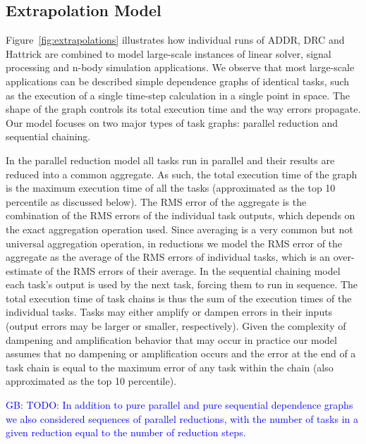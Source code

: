 \documentclass[10pt, conference, compsocconf]{IEEEtran}
\newcommand{\greg}[1]{%
  \textcolor{blue}{GB: #1}
}
\begin{document}
\subsection{Extrapolation Model}
\label{sec:eval:extrapolation}

Figure~\ref{fig:extrapolations} illustrates how individual runs of ADDR, DRC and Hattrick are combined to model large-scale instances of linear solver, signal processing and n-body simulation applications.
We observe that most large-scale applications can be described simple dependence graphs of identical tasks, such as the execution of a single time-step calculation in a single point in space.
The shape of the graph controls its total execution time and the way errors propagate.
Our model focuses on two major types of task graphs: parallel reduction and sequential chaining.

In the parallel reduction model all tasks run in parallel and their results are reduced into a common aggregate.
As such, the total execution time of the graph is the maximum execution time of all the tasks (approximated as the top 10 percentile as discussed below).
The RMS error of the aggregate is the combination of the RMS errors of the individual task outputs, which depends on the exact aggregation operation used.
Since averaging is a very common but not universal aggregation operation, in reductions we model the RMS error of the aggregate as the average of the RMS errors of individual tasks, which is an over-estimate of the RMS errors of their average.
In the sequential chaining model each task's output is used by the next task, forcing them to run in sequence.
The total execution time of task chains is thus the sum of the execution times of the individual tasks.
Tasks may either amplify or dampen errors in their inputs (output errors may be larger or smaller, respectively).
Given the complexity of dampening and amplification behavior that may occur in practice our model assumes that no dampening or amplification occurs and the error at the end of a task chain is equal to the maximum error of any task within the chain (also approximated as the top 10 percentile).

\greg{TODO: In addition to pure parallel and pure sequential dependence graphs we also considered sequences of parallel reductions, with the number of tasks in a given reduction equal to the number of reduction steps.}
\end{document}
